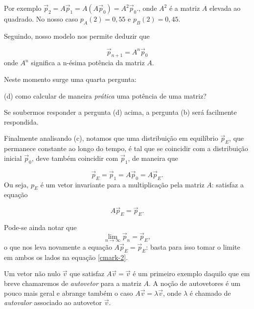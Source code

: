 Por exemplo $ \vec p_2 = A \vec p_1= A (A \vec p_0)= A^2 \vec p_0.$, onde $A^2$ é a matriz $A$ elevada ao quadrado.
No nosso caso $p_A(2)=0,55$ e $p_B(2)=0,45$.

Seguindo, nosso modelo nos permite deduzir que

\begin{equation} \vec p_{n+1} = A^n \vec p_0\end{equation}
onde $A^n$ significa a n-ésima potência da matriz $A$.

Neste momento surge uma quarta pergunta:

\medskip

(d) como calcular de maneira {\it prática} uma potência de uma matriz?

\medskip

Se soubermos responder a pergunta (d) acima, a pergunta (b) será facilmente respondida.

\medskip

Finalmente analisando (c), notamos que uma distribuição em equilíbrio $\vec{p}_E$, que permanece constante ao longo do tempo, é tal que se coincidir com a  distribuição inicial $\vec p_0$, deve também coincidir com $\vec p_1$, de maneira que

\begin{equation} \vec{p}_E =  \vec p_1 = A \vec p_0 = A \vec{p}_E.\end{equation}
Ou seja, $p_E$ é um vetor invariante para a multiplicação pela matriz $A$: satisfaz a equação

\begin{equation} A \vec{p}_E =   \vec{p}_E.\end{equation}


Pode-se ainda notar que \begin{equation}\lim\limits_{n\to \infty}\vec{p}_n = \vec p_E,\end{equation} o que nos leva novamente a equação $ A \vec{p}_E = \vec{p}_E$: basta para isso tomar o limite em ambos os lados na equação \eqref{cmark-2}.

Um vetor não nulo $\vec v$ que satisfaz $A \vec v = \vec v$ é um primeiro exemplo daquilo que em breve chamaremos de {\it autovetor } para a matriz $A$. A noção de autovetores é um pouco mais geral e abrange também o caso $A \vec v = \lambda \vec v$, onde $\lambda$ é chamado de {\it autovalor } associado ao autovetor $\vec v$.

